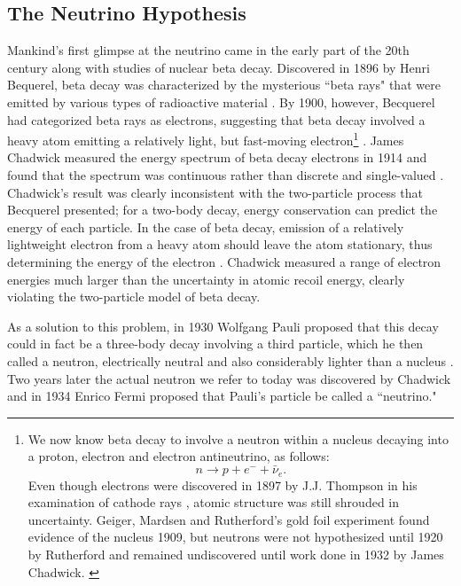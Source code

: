 \subsection{The Neutrino Hypothesis}

Mankind's first glimpse at the neutrino came in the early part of the 20th
century along with studies of nuclear beta decay.  Discovered in 1896 by Henri
Bequerel, beta decay was characterized by the mysterious ``beta rays" that were
emitted by various types of radioactive material \cite{becquerelBeta}.  By
1900, however, Becquerel had categorized beta rays as electrons, suggesting
that beta decay involved a heavy atom emitting a relatively light, but
fast-moving electron\footnote{
We now know beta decay to involve a neutron within a nucleus decaying into a
proton, electron and electron antineutrino, as follows:
\begin{equation*}      n \rightarrow p + e^- + \bar{\nu}_e  . \end{equation*}
Even though electrons were discovered in 1897 by J.J. Thompson in his
examination of cathode rays \cite{thompson}, atomic structure was still
shrouded in uncertainty.  Geiger, Mardsen and Rutherford's gold foil experiment
found evidence of the nucleus 1909, but neutrons were not hypothesized until
1920 by Rutherford \cite{rutherfordNeutron} and remained undiscovered until
work done in 1932 by James Chadwick. \cite{chadwickNeutron}
 } \cite{becquerelElec}.
James Chadwick measured the energy spectrum of beta decay electrons in 1914 and
found that the spectrum was continuous rather than discrete and single-valued
\cite {chadwickBeta}.  Chadwick's result was clearly inconsistent with the
two-particle process that Becquerel presented; for a two-body decay, energy
conservation can predict the energy of each particle.  In the case of
beta decay, emission of a relatively lightweight electron from a heavy atom
should leave the atom stationary, thus determining the energy of the
electron .  Chadwick measured a range of electron energies much larger than the
uncertainty in atomic recoil energy, clearly violating the two-particle model
of beta decay.

As a solution to this problem, in 1930 Wolfgang Pauli proposed that this decay
could in fact be a three-body decay involving a third particle, which he then
called a neutron, electrically neutral and also considerably lighter than a
nucleus \cite{pauliNeuProp}.  Two years later the actual neutron we refer to
today was discovered by Chadwick \cite{chadwickNeutron} and in 1934 Enrico
Fermi proposed that Pauli's particle be called a ``neutrino."
\cite{fermiNeuName}

